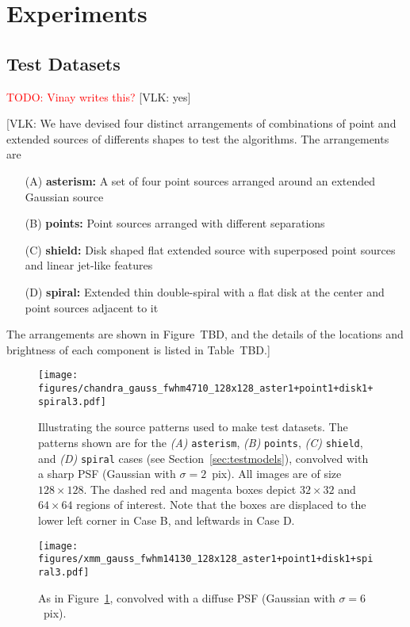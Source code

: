 \documentclass[twocolumn]{aastex631}
\newcommand{\todo}[1]{\textcolor{red}{TODO: #1}\PackageWarning{TODO:}{#1!}}
\newcommand{\vlk}[1]{{\color{blue} [VLK: #1]}}
\begin{document}
    
        
    \section{Experiments}
    \subsection{Test Datasets}
    \label{subsec:test-datasets}
    \todo{Vinay writes this?}
    \vlk{yes}

    \vlk{We have devised four distinct arrangements of combinations of point and extended sources of differents shapes to test the algorithms.  The arrangements are 
    \begin{itemize}
        \item[(A)] {\bf asterism:} A set of four point sources arranged around an extended Gaussian source
        \item[(B)] {\bf points:} Point sources arranged with different separations
        \item[(C)] {\bf shield:} Disk shaped flat extended source with superposed point sources and linear jet-like features
        \item[(D)] {\bf spiral:} Extended thin double-spiral with a flat disk at the center and point sources adjacent to it
    \end{itemize}
    The arrangements are shown in Figure~TBD, and the details of the locations and brightness of each component is listed in Table~TBD.}

    \begin{figure*}
        \centering\texttt{[image: figures/chandra\_gauss\_fwhm4710\_128x128\_aster1+point1+disk1+spiral3.pdf]}
        \caption{Illustrating the source patterns used to make test datasets.  The patterns shown are for the {\sl (A)} {\tt asterism}, {\sl (B)} {\tt points}, {\sl (C)} {\tt shield}, and {\sl (D)} {\tt spiral} cases (see Section~\ref{sec:testmodels}), convolved with a sharp PSF (Gaussian with $\sigma=2$~pix).  All images are of size $128{\times}128$.  The dashed red and magenta boxes depict $32{\times}32$ and $64{\times}64$ regions of interest.  Note that the boxes are displaced to the lower left corner in Case B, and leftwards in Case D.}
        \label{fig:simulated_models_chandra}
    \end{figure*}
     
    \begin{figure*}
        \centering\texttt{[image: figures/xmm\_gauss\_fwhm14130\_128x128\_aster1+point1+disk1+spiral3.pdf]}
        \caption{As in Figure~\ref{fig:simulated_models_chandra}, convolved with a diffuse PSF (Gaussian with $\sigma=6$~pix).}
        \label{fig:simulated_models_xmm}
    \end{figure*}
\end{document}
